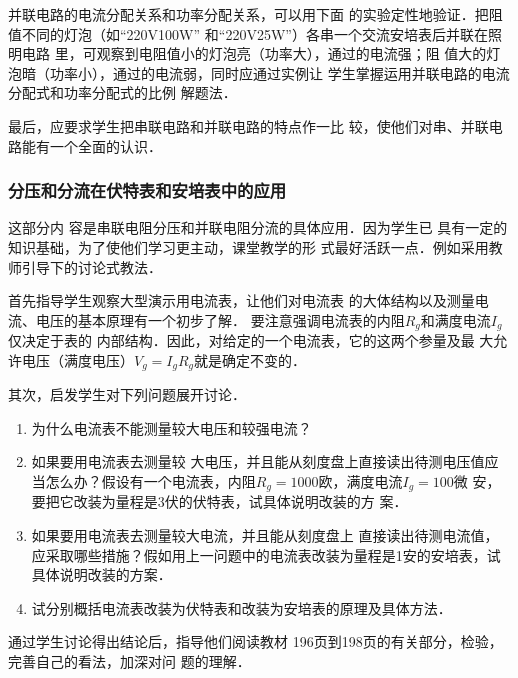 并联电路的电流分配关系和功率分配关系，可以用下面
的实验定性地验证．把阻值不同的灯泡（如“220V100W”
和“220V25W”）各串一个交流安培表后并联在照明电路
里，可观察到电阻值小的灯泡亮（功率大），通过的电流强；阻
值大的灯泡暗（功率小），通过的电流弱，同时应通过实例让
学生掌握运用并联电路的电流分配式和功率分配式的比例
解题法．

最后，应要求学生把串联电路和并联电路的特点作一比
较，使他们对串、并联电路能有一个全面的认识．

\subsubsection{分压和分流在伏特表和安培表中的应用}

这部分内
容是串联电阻分压和并联电阻分流的具体应用．因为学生已
具有一定的知识基础，为了使他们学习更主动，课堂教学的形
式最好活跃一点．例如采用教师引导下的讨论式教法．

首先指导学生观察大型演示用电流表，让他们对电流表
的大体结构以及测量电流、电压的基本原理有一个初步了解．
要注意强调电流表的内阻$R_g$和满度电流$I_g$仅决定于表的
内部结构．因此，对给定的一个电流表，它的这两个参量及最
大允许电压（满度电压）$V_g=I_gR_g$就是确定不变的．

其次，启发学生对下列问题展开讨论．
\begin{enumerate}
    \item 为什么电流表不能测量较大电压和较强电流？
    \item 如果要用电流表去测量较
大电压，并且能从刻度盘上直接读出待测电压值应当怎么办？假设有一个电流表，内阻$R_g=1000$欧，满度电流$I_g=100$微
安，要把它改装为量程是3伏的伏特表，试具体说明改装的方
案．
\item 如果要用电流表去测量较大电流，并且能从刻度盘上
直接读出待测电流值，应采取哪些措施？假如用上一问题中的电流表改装为量程是1安的安培表，试具体说明改装的方案．
\item 试分别概括电流表改装为伏特表和改装为安培表的原理及具体方法．
\end{enumerate}
通过学生讨论得出结论后，指导他们阅读教材
196页到198页的有关部分，检验，完善自己的看法，加深对问
题的理解．

